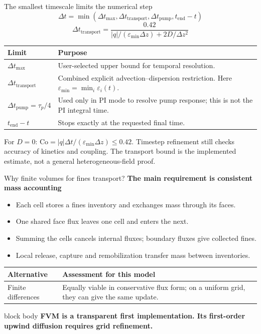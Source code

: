 \documentclass[aspectratio=169,11pt]{beamer}
\newcommand{\hi}[1]{\textcolor{tumblue}{\textbf{#1}}}
\newcommand{\takeaway}[1]{%
  \begin{beamercolorbox}[rounded=true,sep=.55em]{block body}
    \centering\color{tumdark}\textbf{#1}
  \end{beamercolorbox}}
\begin{document}
\begin{frame}{The smallest timescale limits the numerical step}
\small
\[
\Delta t=\min\left(\Delta t_{\max},\Delta t_{\mathrm{transport}},
\Delta t_{\mathrm{pump}},t_{\mathrm{end}}-t\right)
\]
\[\Delta t_{\mathrm{transport}}=\frac{0.42}{|q|/(\varepsilon_{\min}\Delta z)+2D/\Delta z^2}\]
\begin{tabular}{p{3.5cm}p{8cm}}
\toprule
Limit & Purpose\\\midrule
$\Delta t_{\max}$ & User-selected upper bound for temporal resolution.\\[.5em]
$\Delta t_{\mathrm{transport}}$ & Combined explicit advection--dispersion restriction. Here $\varepsilon_{\min}=\min_i\varepsilon_i(t)$.\\[.5em]
$\Delta t_{\mathrm{pump}}=\tau_p/4$ & Used only in PI mode to resolve pump response; this is not the PI integral time.\\[.5em]
$t_{\mathrm{end}}-t$ & Stops exactly at the requested final time.\\\bottomrule
\end{tabular}
\vfill\small For $D=0$: $\mathrm{Co}=|q|\Delta t/(\varepsilon_{\min}\Delta z)\leq0.42$.
Timestep refinement still checks accuracy of kinetics and coupling. The transport bound is the implemented estimate, not a general heterogeneous-field proof.
\end{frame}

\begin{frame}{Why finite volumes for fines transport?}
\small
\hi{The main requirement is consistent mass accounting}
\begin{itemize}
\item Each cell stores a fines inventory and exchanges mass through its faces.
\item One shared face flux leaves one cell and enters the next.
\item Summing the cells cancels internal fluxes; boundary fluxes give collected fines.
\item Local release, capture and remobilization transfer mass between inventories.
\end{itemize}
\medskip
\begin{tabular}{p{2.5cm}p{9cm}}
\toprule
Alternative & Assessment for this model\\\midrule
Finite differences & Equally viable in conservative flux form; on a uniform grid, they can give the same update.\\\bottomrule
\end{tabular}
\vfill\takeaway{FVM is a transparent first implementation. Its first-order upwind diffusion requires grid refinement.}
\end{frame}
\end{document}
